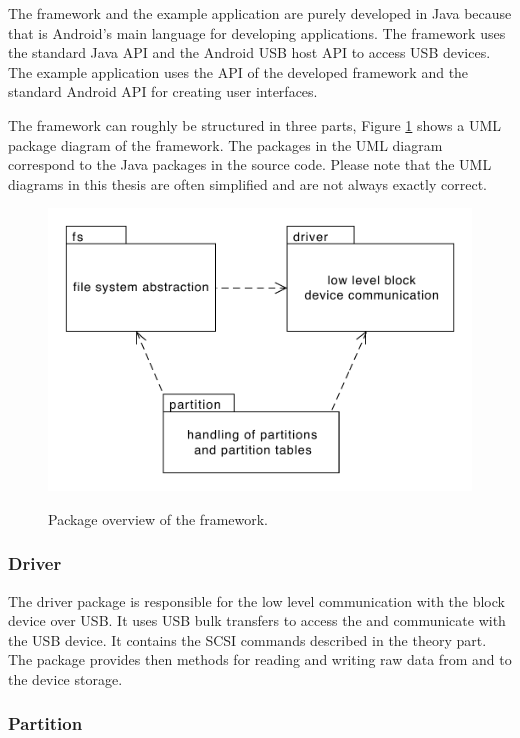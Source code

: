 The framework and the example application are purely developed in Java because that is Android's main language for developing applications. The framework uses the standard Java API and the Android USB host API to access USB devices. The example application uses the API of the developed framework and the standard Android API for creating user interfaces.

The framework can roughly be structured in three parts, Figure \ref{figure:package} shows a UML package diagram of the framework. The packages in the UML diagram correspond to the Java packages in the source code. Please note that the UML diagrams in this thesis are often simplified and are not always exactly correct.

\begin{figure}[h!]
\caption{Package overview of the framework.}
\centering
\includegraphics[scale=0.9]{figures/package}
\label{figure:package}
\end{figure}

\subsubsection{Driver}

The driver package is responsible for the low level communication with the block device over USB. It uses USB bulk transfers to access the and communicate with the USB device. It contains the SCSI commands described in the theory part. The package provides then methods for reading and writing raw data from and to the device storage.

\subsubsection{Partition}

